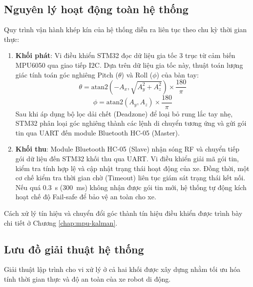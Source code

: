 \subsection{Nguyên lý hoạt động toàn hệ thống}
Quy trình vận hành khép kín của hệ thống diễn ra liên tục theo chu kỳ thời gian thực:
\begin{enumerate}
    \item \textbf{Khối phát}: Vi điều khiển STM32 đọc dữ liệu gia tốc 3 trục từ cảm biến MPU6050 qua giao tiếp I2C. Dựa trên dữ liệu gia tốc này, thuật toán lượng giác tính toán góc nghiêng Pitch ($\theta$) và Roll ($\phi$) của bàn tay:
    \[ \theta = \mathrm{atan2}(-A_x, \sqrt{A_y^2 + A_z^2}) \times \frac{180}{\pi} \]
    \[ \phi = \mathrm{atan2}(A_y, A_z) \times \frac{180}{\pi} \]
    Sau khi áp dụng bộ lọc dải chết (Deadzone) để loại bỏ rung lắc tay nhẹ, STM32 phân loại góc nghiêng thành các lệnh di chuyển tương ứng và gửi gói tin qua UART đến module Bluetooth HC-05 (Master).
    \item \textbf{Khối thu}: Module Bluetooth HC-05 (Slave) nhận sóng RF và chuyển tiếp gói dữ liệu đến STM32 khối thu qua UART. Vi điều khiển giải mã gói tin, kiểm tra tính hợp lệ và cập nhật trạng thái hoạt động của xe. Đồng thời, một cơ chế kiểm tra thời gian chờ (Timeout) liên tục giám sát trạng thái kết nối. Nếu quá \qty{0.3}{\second} (\qty{300}{\ms}) không nhận được gói tin mới, hệ thống tự động kích hoạt chế độ Fail-safe để bảo vệ an toàn cho xe.
\end{enumerate}

Cách xử lý tín hiệu và chuyển đổi góc thành tín hiệu điều khiển được trình bày chi tiết ở Chương \ref{chap:mpu-kalman}.

\subsection{Lưu đồ giải thuật hệ thống}
Giải thuật lập trình cho vi xử lý ở cả hai khối được xây dựng nhằm tối ưu hóa tính thời gian thực và độ an toàn của xe robot di động.

